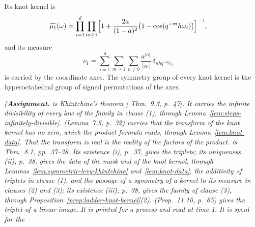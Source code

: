 \begin{proposition}
\begin{enumerate}
Its knot kernel is
\[
\widehat{\mu_1}(\omega) = \prod_{i=1}^d\prod_{m \ge 1}\Bigl[1 + \frac{2a}{(1-a)^2}
\bigl(1 - \cos(q^{-m}h\omega_i)\bigr)\Bigr]^{-1},
\]
and its \Levy{} measure
\begin{equation}\label{eq:frame-levy}
\nu_1 = \sum_{i=1}^{d}\sum_{m \ge 1}\sum_{n \ne 0}\frac{a^{|n|}}{|n|}\,\delta_{nhq^{-m}e_i}
\end{equation}
is carried by the coordinate axes. The symmetry group of every knot kernel is the hyperoctahedral
group of signed permutations of the axes.
\end{enumerate}
\statusA\quad{}\quad{}\quad{}\quad{}\quad\emph{(\textbf{Assignment.}
 is Khintchine's theorem [ Thm.~9.3, p.~47]. It carries the
infinite divisibility of every law of the family in clause (1), through
Lemma~\ref{lem:steps-infinitely-divisible}.  (Lemma~7.5,
p.~32) carries that the transform of the knot kernel has no zero, which the product formula reads,
through Lemma~\ref{lem:knot-data}.
That the transform is real is the reality of the factors of the product.
 is Thm.~8.1, pp.~37--38. Its existence (i), p.~37, gives the triplets; its uniqueness
(ii), p.~38, gives the data of the mask and of the knot kernel, through
Lemmas~\ref{lem:symmetric-levy-khintchine} and~\ref{lem:knot-data}, the additivity
of triplets in clause (1), and the passage of a symmetry of a kernel to its \Levy{} measure in
clauses (2) and (3); its existence (iii), p.~38, gives the family of clause (3), through
Proposition~\ref{prop:ladder-knot-kernel}(2).  (Prop.~11.10, p.~65) gives the triplet of
a linear image. It is printed for a \Levy{} process and read at time 1. It is spent for the
}
\end{proposition}
